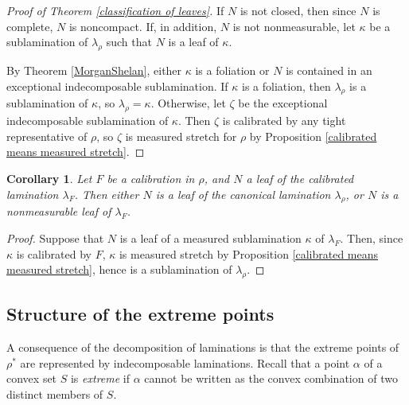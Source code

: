 \documentclass[reqno,11pt]{amsart}
\newcommand{\dfn}[1]{\emph{#1}\index{#1}}
\newtheorem{corollary}[theorem]{Corollary}
\theoremstyle{definition}
\numberwithin{equation}{section}
\begin{document}
\begin{proof}[Proof of Theorem \ref{classification of leaves}]
If $N$ is not closed, then since $N$ is complete, $N$ is noncompact.
If, in addition, $N$ is not nonmeasurable, let $\kappa$ be a sublamination of $\lambda_\rho$ such that $N$ is a leaf of $\kappa$.

By Theorem \ref{MorganShelan}, either $\kappa$ is a foliation or $N$ is contained in an exceptional indecomposable sublamination.
If $\kappa$ is a foliation, then $\lambda_\rho$ is a sublamination of $\kappa$, so $\lambda_\rho = \kappa$.
Otherwise, let $\zeta$ be the exceptional indecomposable sublamination of $\kappa$.
Then $\zeta$ is calibrated by any tight representative of $\rho$, so $\zeta$ is measured stretch for $\rho$ by Proposition \ref{calibrated means measured stretch}.
\end{proof}

\begin{corollary}
Let $F$ be a calibration in $\rho$, and $N$ a leaf of the calibrated lamination $\lambda_F$.
Then either $N$ is a leaf of the canonical lamination $\lambda_\rho$, or $N$ is a nonmeasurable leaf of $\lambda_F$.
\end{corollary}
\begin{proof}
Suppose that $N$ is a leaf of a measured sublamination $\kappa$ of $\lambda_F$.
Then, since $\kappa$ is calibrated by $F$, $\kappa$ is measured stretch by Proposition \ref{calibrated means measured stretch}, hence is a sublamination of $\lambda_\rho$.
\end{proof}




\subsection{Structure of the extreme points}
A consequence of the decomposition of laminations is that the extreme points of $\rho^*$ are represented by indecomposable laminations.
Recall that a point $\alpha$ of a convex set $S$ is \dfn{extreme} if $\alpha$ cannot be written as the convex combination of two distinct members of $S$.
\end{document}
